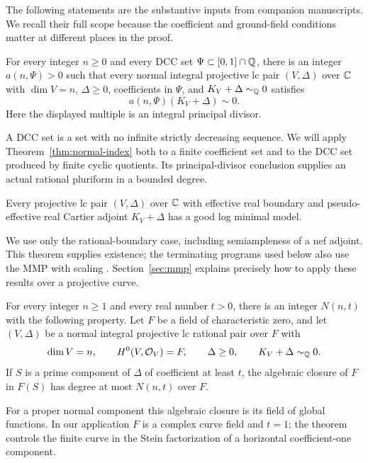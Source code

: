 The following statements are the substantive inputs from companion
manuscripts. We recall their full scope because the coefficient and
ground-field conditions matter at different places in the proof.

\begin{theorem}
\label{thm:normal-index}
For every integer $n\geq0$ and every DCC set
$\Psi\subset[0,1]\cap\mathbb Q$, there is an integer $a(n,\Psi)>0$
such that every normal integral projective lc pair $(V,\Delta)$ over
$\mathbb C$ with $\dim V=n$, $\Delta\geq0$, coefficients in $\Psi$, and
$K_V+\Delta\sim_{\mathbb Q}0$ satisfies
\[
                     a(n,\Psi)(K_V+\Delta)\sim0.
\]
Here the displayed multiple is an integral principal divisor.
\end{theorem}

A DCC set is a set with no infinite strictly decreasing sequence.
We will apply Theorem~\ref{thm:normal-index} both to a finite coefficient
set and to the DCC set produced by finite cyclic quotients. Its
principal-divisor conclusion supplies an actual rational pluriform
in a bounded degree.

\begin{theorem}
\label{thm:good-models}
Every projective lc pair $(V,\Delta)$ over $\mathbb C$ with effective
real boundary and pseudo-effective real Cartier adjoint
$K_V+\Delta$ has a good log minimal model.
\end{theorem}

We use only the rational-boundary case, including semiampleness of a nef
adjoint. This theorem supplies existence; the terminating programs used
below also use the MMP with scaling \cite{TX}. Section~\ref{sec:mmp}
explains precisely how to apply these results over a projective curve.

\begin{theorem}
\label{thm:stein-degree}
For every integer $n\geq1$ and every real number $t>0$, there is
an integer $N(n,t)$ with the following property. Let $F$ be a field of
characteristic zero, and let $(V,\Delta)$ be a normal integral projective
lc rational pair over $F$ with
\[
 \dim V=n,\qquad H^0(V,\mathcal O_V)=F,\qquad
 \Delta\geq0,\qquad K_V+\Delta\sim_{\mathbb Q}0.
\]
If $S$ is a prime component of $\Delta$ of coefficient at least $t$,
the algebraic closure of $F$ in $F(S)$ has degree at most $N(n,t)$
over $F$.
\end{theorem}

For a proper normal component this algebraic closure is its field of
global functions. In our application $F$ is a complex curve field and
$t=1$; the theorem controls the finite curve in the Stein factorization
of a horizontal coefficient-one component.

